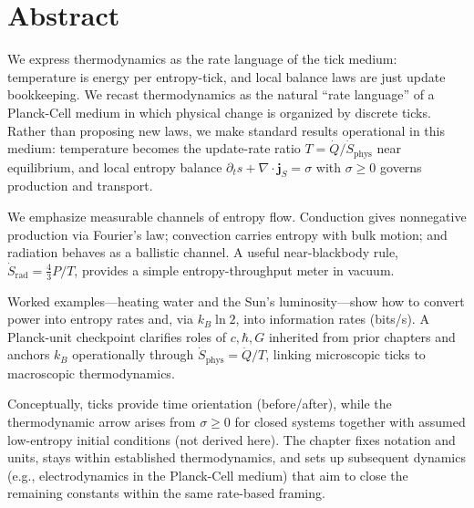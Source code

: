  \section*{Abstract}
We express thermodynamics as the rate language of the tick medium: temperature is energy per entropy-tick, and local balance laws are just update bookkeeping.
We recast thermodynamics as the natural “rate language” of a Planck-Cell medium in which physical change is organized by discrete ticks. Rather than proposing new laws, we make standard results operational in this medium: temperature becomes the update-rate ratio \(T=\dot Q/\dot S_{\mathrm{phys}}\) near equilibrium, and local entropy balance \(\partial_t s+\nabla\!\cdot\!\mathbf j_S=\sigma\) with \(\sigma\ge0\) governs production and transport.

We emphasize measurable channels of entropy flow. Conduction gives nonnegative production via Fourier’s law; convection carries entropy with bulk motion; and radiation behaves as a ballistic channel. A useful near-blackbody rule, \(\dot S_{\mathrm{rad}}=\tfrac{4}{3}P/T\), provides a simple entropy-throughput meter in vacuum.

Worked examples—heating water and the Sun’s luminosity—show how to convert power into entropy rates and, via \(k_B\ln 2\), into information rates (bits/s). A Planck-unit checkpoint clarifies roles of \(c,\hbar,G\) inherited from prior chapters and anchors \(k_B\) operationally through \(\dot S_{\mathrm{phys}}=\dot Q/T\), linking microscopic ticks to macroscopic thermodynamics.

Conceptually, ticks provide time orientation (before/after), while the thermodynamic arrow arises from \(\sigma\ge0\) for closed systems together with assumed low-entropy initial conditions (not derived here). The chapter fixes notation and units, stays within established thermodynamics, and sets up subsequent dynamics (e.g., electrodynamics in the Planck-Cell medium) that aim to close the remaining constants within the same rate-based framing.